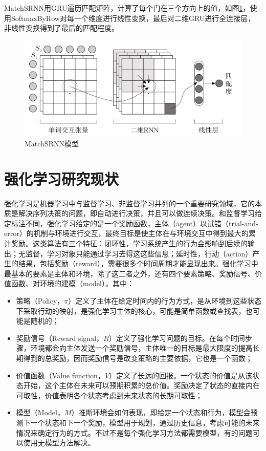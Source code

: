 MatchSRNN用GRU遍历匹配矩阵，计算了每个门在三个方向上的值，如图\ref{fig:MatchSRNN}，使用SoftmaxByRow对每一个维度进行线性变换，最后对二维GRU进行全连接层，非线性变换得到了最后的匹配程度。
\begin{figure}[!htbp]
\vspace{1em}
\centering
  \includegraphics[width=0.9\linewidth]{figures/MatchSRNN.jpg}
  \caption{MatchSRNN模型}
  \label{fig:MatchSRNN}       %
\vspace{1em}
\end{figure}



\section{强化学习研究现状}
强化学习是机器学习中与监督学习、非监督学习并列的一个重要研究领域，它的本质是解决序列决策的问题，即自动进行决策，并且可以做连续决策\cite{Sutton1998ReinFORcementL}。和监督学习给定标注不同，强化学习给定的是一个奖励函数，主体（agent）以试错（trial-and-error）的机制与环境进行交互，最终目标是使主体在与环境交互中得到最大的累计奖励。这类算法有三个特征：闭环性，学习系统产生的行为会影响到后续的输出；无监督，学习对象只能通过学习去得这这些信息；延时性，行动（action）产生的结果，包括奖励（reward），需要很多个时间周期才能显现出来。强化学习中最基本的要素是主体和环境，除了这二者之外，还有四个要素策略、奖励信号、价值函数、对环境的建模（model）。其中：
\begin{itemize}
  \item 策略（Policy，$\pi$）定义了主体在给定时间内的行为方式，是从环境到这些状态下采取行动的映射，是强化学习主体的核心，可能是简单函数或查找表，也可能是随机的；

  \item 奖励信号（Reward signal，$R$）定义了强化学习问题的目标。在每个时间步骤，环境都会向主体发送一个奖励信号，主体唯一的目标是最大限度的提高长期得到的总奖励，因而奖励信号是改变策略的主要依据，它也是一个函数；

  \item 价值函数（Value function，$V$）定义了长远的回报。一个状态的价值是从该状态开始，这个主体在未来可以预期积累的总价值。奖励决定了状态的直接内在可取性，价值表明各个状态考虑到未来状态的长期可取性；

  \item 模型（Model，$M$）推断环境会如何表现，即给定一个状态和行为，模型会预测下一个状态和下一个奖励，模型用于规划，通过历史信息，考虑可能的未来情况来确定行为的方式。不过不是每个强化学习方法都需要模型，有的问题可以使用无模型方法解决。
\end{itemize}

